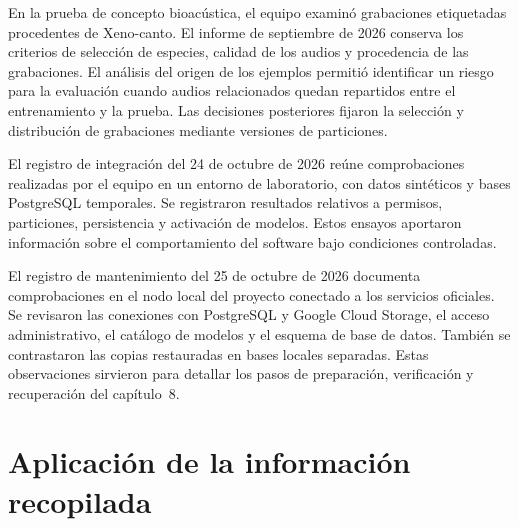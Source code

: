 En la prueba de concepto bioacústica, el equipo examinó grabaciones
etiquetadas procedentes de Xeno-canto. El informe de septiembre de 2026
conserva los criterios de selección de especies, calidad de los audios
y procedencia de las grabaciones. El análisis del origen de los
ejemplos permitió identificar un riesgo para la evaluación cuando audios
relacionados quedan repartidos entre el entrenamiento y la prueba. Las
decisiones posteriores fijaron la selección y distribución de grabaciones
mediante versiones de particiones.

El registro de integración del 24 de octubre de 2026 reúne comprobaciones
realizadas por el equipo en un entorno de laboratorio, con datos sintéticos
y bases PostgreSQL temporales. Se registraron resultados relativos a
permisos, particiones, persistencia y activación de modelos. Estos ensayos
aportaron información sobre el comportamiento del software bajo condiciones
controladas.

El registro de mantenimiento del 25 de octubre de 2026 documenta
comprobaciones en el nodo local del proyecto conectado a los servicios
oficiales. Se revisaron las conexiones con PostgreSQL y Google Cloud Storage,
el acceso administrativo, el catálogo de modelos y el esquema de base de
datos. También se contrastaron las copias restauradas en bases locales
separadas. Estas observaciones sirvieron para detallar los pasos de
preparación, verificación y recuperación del capítulo~8.

\section{Aplicación de la información recopilada}

